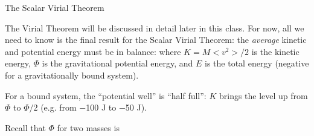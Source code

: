 \documentclass[letterpaper,landscape]{slides}
\begin{document}
\begin{slide}
{\begin{minipage}[t]{13cm}
	\end{minipage}}
	\vfill 
\end{slide}




\begin{slide}
	\begin{center}
		{\large \color{red} 
			The Scalar Virial Theorem}
	\end{center}
	
	The Virial Theorem will be discussed in detail later in this class.  For now, 
	all we need to know is the final result for the {\color{blue} Scalar} Virial Theorem:
	the {\it average} kinetic and potential energy must be in balance:
	where $K = M<v^2>/2$ is the kinetic energy, $\Phi$ is the gravitational potential
	energy, and $E$ is the total energy (negative for a gravitationally bound system). 

        For a bound system, the ``potential well'' is ``half full'': $K$ brings the level up 
        from $\Phi$  to $\Phi/2$ (e.g. from $-$100 J to $-$50 J). 
	
       Recall that $\Phi$ for two masses is 
	
	\vfill
\end{slide}








%	
\end{document}
